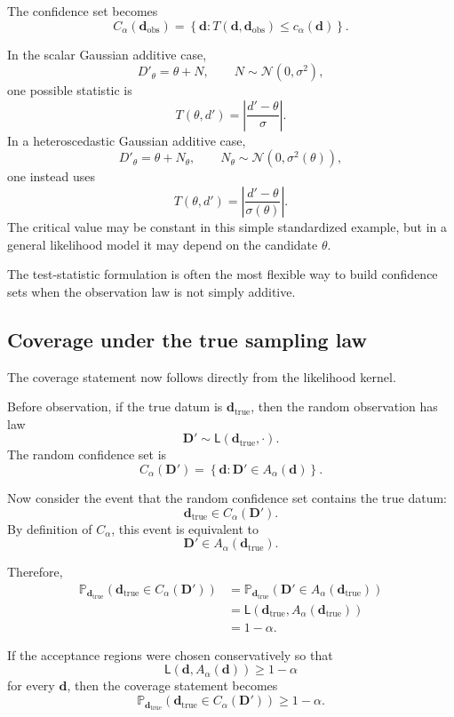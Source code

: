 \documentclass[11pt]{article}
\newcommand{\Dobsrand}{\mathbf D'}
\newcommand{\dtrue}{\mathbf d_{\mathrm{true}}}
\newcommand{\dobs}{\mathbf d_{\mathrm{obs}}}
\newcommand{\Calpha}{C_{\alpha}}
\newcommand{\Prob}{\mathbb P}
\begin{document}
The confidence set becomes
\[
    \Calpha(\dobs)
    =
    \left\{
        \mathbf d:
        T(\mathbf d,\dobs)\leq c_{\alpha}(\mathbf d)
    \right\}.
\]

In the scalar Gaussian additive case,
\[
    D'_{\theta}=\theta+N,
    \qquad
    N\sim\mathcal N(0,\sigma^2),
\]
one possible statistic is
\[
    T(\theta,d')
    =
    \left|
        \frac{d'-\theta}{\sigma}
    \right|.
\]
In a heteroscedastic Gaussian additive case,
\[
    D'_{\theta}=\theta+N_{\theta},
    \qquad
    N_{\theta}\sim\mathcal N(0,\sigma^2(\theta)),
\]
one instead uses
\[
    T(\theta,d')
    =
    \left|
        \frac{d'-\theta}{\sigma(\theta)}
    \right|.
\]
The critical value may be constant in this simple standardized example, but in a general likelihood model it may depend on the candidate \(\theta\).

The test-statistic formulation is often the most flexible way to build confidence sets when the observation law is not simply additive.

\subsection{Coverage under the true sampling law}

The coverage statement now follows directly from the likelihood kernel.

Before observation, if the true datum is \(\dtrue\), then the random observation has law
\[
    \Dobsrand\sim\mathsf L(\dtrue,\cdot).
\]
The random confidence set is
\[
    \Calpha(\Dobsrand)
    =
    \left\{
        \mathbf d:
        \Dobsrand\in A_{\alpha}(\mathbf d)
    \right\}.
\]

Now consider the event that the random confidence set contains the true datum:
\[
    \dtrue\in\Calpha(\Dobsrand).
\]
By definition of \(\Calpha\), this event is equivalent to
\[
    \Dobsrand\in A_{\alpha}(\dtrue).
\]

Therefore,
\[
\begin{aligned}
    \Prob_{\dtrue}
    \left(
        \dtrue\in\Calpha(\Dobsrand)
    \right)
    &=
    \Prob_{\dtrue}
    \left(
        \Dobsrand\in A_{\alpha}(\dtrue)
    \right)
    \\
    &=
    \mathsf L
    \left(
        \dtrue,
        A_{\alpha}(\dtrue)
    \right)
    \\
    &=
    1-\alpha.
\end{aligned}
\]

If the acceptance regions were chosen conservatively so that
\[
    \mathsf L
    \left(
        \mathbf d,
        A_{\alpha}(\mathbf d)
    \right)
    \geq
    1-\alpha
\]
for every \(\mathbf d\), then the coverage statement becomes
\[
    \Prob_{\dtrue}
    \left(
        \dtrue\in\Calpha(\Dobsrand)
    \right)
    \geq
    1-\alpha.
\]
\end{document}
